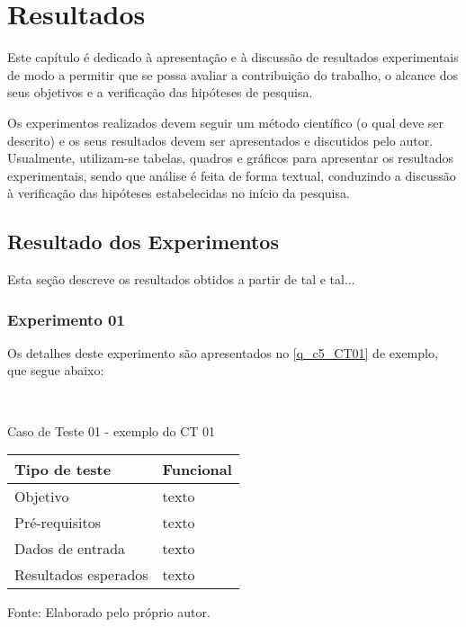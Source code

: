 \chapter{Resultados}
\label{c_cap5}

Este capítulo é dedicado à apresentação e à discussão de resultados experimentais de modo a permitir que se possa avaliar a contribuição do trabalho, o alcance dos seus objetivos e a verificação das hipóteses de pesquisa.

Os experimentos realizados devem seguir um método científico (o qual deve ser descrito) e os seus resultados devem ser apresentados e discutidos pelo autor. Usualmente, utilizam-se tabelas, quadros e gráficos para apresentar os resultados experimentais, sendo que análise é feita de forma textual, conduzindo a discussão à verificação das hipóteses estabelecidas no início da pesquisa.




\section{Resultado dos Experimentos}
\label{s_c5_experimentos}

Esta seção descreve os resultados obtidos a partir de tal e tal...




\subsection{Experimento 01}
\label{ss_c5_CT01}

Os detalhes deste experimento são apresentados no \autoref{q_c5_CT01} de exemplo, que segue abaixo:

\


\begin{quadro}[!htbp]
 \caption{Caso de Teste 01 - exemplo do CT 01}
 \label{q_c5_CT01} 
 \begin{center}
 \begin{footnotesize} 

\begin{tabular}{|p{3.2cm}|p{13cm}|}
\hline
Tipo de teste & Funcional \\ \hline
Objetivo & texto \\ \hline
Pré-requisitos & texto \\ \hline
Dados de entrada & texto \\ \hline
Resultados esperados & texto \\ \hline
\end{tabular}
 
 \end{footnotesize}
 \end{center} 
 \raggedright Fonte: Elaborado pelo próprio autor. 
\end{quadro}


